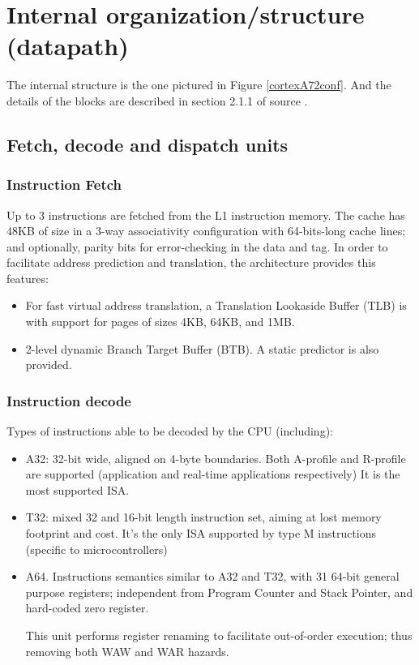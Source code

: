 \section{Internal organization/structure (datapath)}
The internal structure is the one pictured in Figure \ref*{cortexA72conf}. And the details of the blocks are described in section 2.1.1 of source \cite{cortexA72manual}.
\subsection*{Fetch, decode and dispatch units}
\subsubsection*{Instruction Fetch}
Up to 3 instructions are fetched from the L1 instruction memory. The cache has 48KB of size in a 3-way associativity configuration with 64-bits-long cache lines; and optionally, parity bits for error-checking in the data and tag. 
In order to facilitate address prediction and translation, the architecture provides this features: 
\begin{itemize}
	\item {For fast virtual address translation, a Translation Lookaside Buffer (TLB) is with support for pages of sizes 4KB, 64KB, and  1MB.} \label{tlb}
	\item {2-level dynamic Branch Target Buffer (BTB). A static predictor is also provided.}
\end{itemize}


\subsubsection*{Instruction decode}
Types of instructions able to be decoded by the CPU (including)\cite{cortexA72manual}:

\begin{itemize}
	\item {A32: 32-bit wide, aligned on 4-byte boundaries. Both A-profile and R-profile are supported (application and real-time applications respectively) It is the most supported ISA. 
		} \cite{a32instr}
	\item {T32: mixed 32 and 16-bit length instruction set, aiming at lost memory footprint and cost. 
		It's the only ISA supported by type M instructions (specific to microcontrollers)\cite{t32instr}} 
	\item {A64. Instructions semantics similar to A32 and T32, with 31 64-bit general purpose registers; independent from Program Counter and Stack Pointer, and hard-coded zero register.} \cite{a64instr}
	
	This unit performs register renaming to facilitate out-of-order execution; thus removing both WAW and WAR hazards.
\end{itemize}


